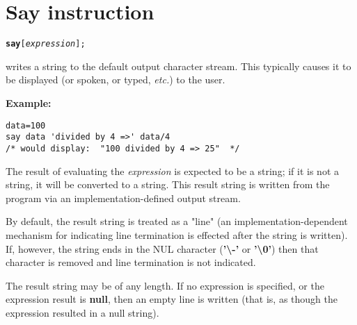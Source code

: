 \section{Say instruction}\label{refsay}
\index{,}
\index{,}
\begin{shaded}
\begin{alltt}
\textbf{say} [\emph{expression}];
\end{alltt}
\end{shaded}
  writes a string to the default output character
stream.
This typically causes it to be displayed (or spoken, or typed, \emph{etc.}) to
the user.

\textbf{Example:}
\begin{lstlisting}
data=100
say data 'divided by 4 =>' data/4
/* would display:  "100 divided by 4 => 25"  */
\end{lstlisting}
 
The result of evaluating the \emph{expression} is expected to be a
string; if it is not a string, it will be converted to a string.
This result string is written from the program via an
implementation-defined output stream.
 
\begin{shaded}\noindent
By default, the result string is treated as a "line" (an
implementation-dependent mechanism for indicating line termination is
effected after the string is written).
If, however, the string ends in the NUL character
(\textbf{'\textbackslash -'} or \textbf{'\textbackslash 0'}) then that character
is removed and line termination is not indicated.
\end{shaded}\indent
The result string may be of any length.  If no expression is specified,
or the expression result is \textbf{null}, then an empty line is
written (that is, as though the expression resulted in a null string).
